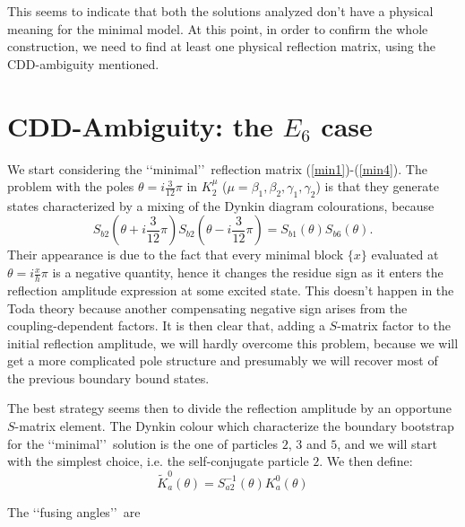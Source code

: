 \documentclass[a4paper,12pt]{report}
\begin{document}
This seems to indicate that both the solutions analyzed don't have a physical meaning for the minimal model. At
this point, in order to confirm the whole construction, we need to find at least one physical reflection matrix,
using the CDD-ambiguity mentioned.

\vspace{1cm}


\section{CDD-Ambiguity: the $E_{6}$ case}


We start considering the \lq\lq minimal\rq\rq \, reflection matrix (\ref{min1})-(\ref{min4}). The problem with the
poles $\theta=i\frac{3}{12}\pi$ in $K_{2}^{\mu}$ ($\mu=\beta_{1},\beta_{2},\gamma_{1},\gamma_{2}$) is that they
generate states characterized by a mixing of the Dynkin diagram colourations, because
\begin{equation}
S_{b2}\left(\theta+i\frac{3}{12}\pi\right)S_{b2}\left(\theta-i\frac{3}{12}\pi\right)=S_{b1}\left(\theta\right)S_{b6}\left(\theta\right).
\end{equation}
Their appearance is due to the fact that every minimal block $\{x\}$ evaluated at $\theta=i\frac{x}{h}\pi$ is a
negative quantity, hence it changes the residue sign as it enters the reflection amplitude expression at some
excited state. This doesn't happen in the Toda theory because another compensating negative sign arises from the
coupling-dependent factors. It is then clear that, adding a $S$-matrix factor to the initial reflection amplitude,
we will hardly overcome this problem, because we will get a more complicated pole structure and presumably we
will recover most of the previous boundary bound states.

The best strategy seems then to divide the reflection amplitude by an opportune $S$-matrix element. The Dynkin
colour which characterize the boundary bootstrap for the \lq\lq minimal\rq\rq \, solution is the one of particles
$2$, $3$ and $5$, and we will start with the simplest choice, i.e. the self-conjugate particle $2$. We then
define:
\begin{equation}\label{E6CDD}
\widetilde{K}_{a}^{0}(\theta)=S_{a2}^{-1}(\theta)K_{a}^{0}(\theta)
\end{equation}

The \lq\lq fusing angles\rq\rq \, are
\end{document}
